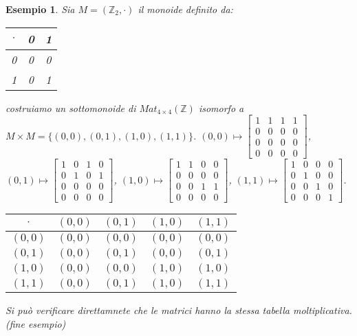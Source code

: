 \documentclass[a4paper,12pt]{article}
\theoremstyle{def}
\theoremstyle{prop}
\theoremstyle{esempio}
\newtheorem*{example}{Esempio}
\theoremstyle{dimostrazione}
\theoremstyle{teo}
\theoremstyle{osservazione}
\begin{document}
\newpage
\begin{example}
	Sia \(M = (\mathbb{Z}_2, \cdot)\) il monoide definito da:
	\begin{table}[htbp]
		\centering
		\begin{tabular}{|c|c|c|}
			\hline
			\(\cdot\) & 0 & 1 \\ \hline
			0         & 0 & 0 \\ \hline
			1         & 0 & 1 \\ \hline
		\end{tabular}
	\end{table}
	\newline costruiamo un sottomonoide di \(Mat_{4 \times 4}(\mathbb{Z})\) isomorfo a \(M \times M = \{(0,0), (0,1),
	(1,0),(1,1)\}\).\newline
	\newline\((0,0) \mapsto
	\begin{bmatrix}
		1 & 1 & 1 & 1 \\
		0 & 0 & 0 & 0 \\
		0 & 0 & 0 & 0 \\
		0 & 0 & 0 & 0
	\end{bmatrix}\),
	\((0,1) \mapsto \begin{bmatrix}
		1 & 0 & 1 & 0 \\
		0 & 1 & 0 & 1 \\
		0 & 0 & 0 & 0 \\
		0 & 0 & 0 & 0
	\end{bmatrix} \),
	\((1,0) \mapsto \begin{bmatrix}
		1 & 1 & 0 & 0 \\
		0 & 0 & 0 & 0 \\
		0 & 0 & 1 & 1 \\
		0 & 0 & 0 & 0
	\end{bmatrix} \),
	\((1,1) \mapsto \begin{bmatrix}
		1 & 0 & 0 & 0 \\
		0 & 1 & 0 & 0 \\
		0 & 0 & 1 & 0 \\
		0 & 0 & 0 & 1
	\end{bmatrix} \).\newline

	\begin{table}[htbp]
		\centering
		\begin{tabular}{|c|c|c|c|c|}
			\hline
			\(\cdot\) & \((0,0)\) & \((0,1)\) & \((1,0)\) & \((1,1)\) \\ \hline
			\((0,0)\) & \((0,0)\) & \((0,0)\) & \((0,0)\) & \((0,0)\) \\ \hline
			\((0,1)\) & \((0,0)\) & \((0,1)\) & \((0,0)\) & \((0,1)\) \\ \hline
			\((1,0)\) & \((0,0)\) & \((0,0)\) & \((1,0)\) & \((1,0)\) \\ \hline
			\((1,1)\) & \((0,0)\) & \((0,1)\) & \((1,0)\) & \((1,1)\) \\ \hline
		\end{tabular}
	\end{table}
	Si può verificare direttamnete che le matrici hanno la stessa tabella moltiplicativa. (fine esempio)
\end{example}
\end{document}
